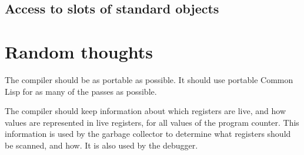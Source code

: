 \subsection{Access to slots of standard objects}

\section{Random thoughts}

The compiler should be as portable as possible.  It should use
portable Common Lisp for as many of the passes as possible.

The compiler should keep information about which registers are live,
and how values are represented in live registers, for all values of
the program counter.  This information is used by the garbage
collector to determine what registers should be scanned, and how.   It
is also used by the debugger.

